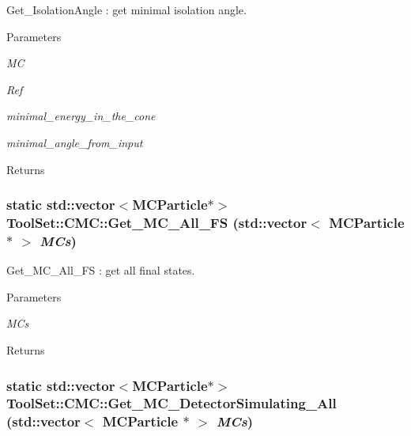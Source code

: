 Get\_\-IsolationAngle : get minimal isolation angle. 
\begin{DoxyParams}{Parameters}
\item[{\em MC}]\item[{\em Ref}]\item[{\em minimal\_\-energy\_\-in\_\-the\_\-cone}]\item[{\em minimal\_\-angle\_\-from\_\-input}]\end{DoxyParams}
\begin{DoxyReturn}{Returns}

\end{DoxyReturn}
\hypertarget{classToolSet_1_1CMC_a826b4fcc4ae58b18ceec544fb5abf563}{
\subsubsection[{Get\_\-MC\_\-All\_\-FS}]{\setlength{\rightskip}{0pt plus 5cm}static std::vector$<$MCParticle$\ast$$>$ ToolSet::CMC::Get\_\-MC\_\-All\_\-FS (std::vector$<$ MCParticle $\ast$ $>$ {\em MCs})}}
\label{classToolSet_1_1CMC_a826b4fcc4ae58b18ceec544fb5abf563}


Get\_\-MC\_\-All\_\-FS : get all final states. 
\begin{DoxyParams}{Parameters}
\item[{\em MCs}]\end{DoxyParams}
\begin{DoxyReturn}{Returns}

\end{DoxyReturn}
\hypertarget{classToolSet_1_1CMC_a8581240b2a8d474e851c3c1ed256fada}{
\subsubsection[{Get\_\-MC\_\-DetectorSimulating\_\-All}]{\setlength{\rightskip}{0pt plus 5cm}static std::vector$<$MCParticle$\ast$$>$ ToolSet::CMC::Get\_\-MC\_\-DetectorSimulating\_\-All (std::vector$<$ MCParticle $\ast$ $>$ {\em MCs})}}
\label{classToolSet_1_1CMC_a8581240b2a8d474e851c3c1ed256fada}


